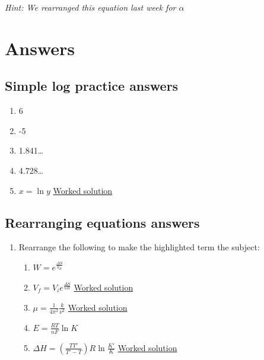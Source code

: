 \documentclass[
]{book}
\providecommand{\tightlist}{%
  \setlength{\itemsep}{0pt}\setlength{\parskip}{0pt}}
\begin{document}
\emph{Hint: We rearranged this equation last week for \(\alpha\)}

\hypertarget{sec:Answers2}{%
\section{Answers}\label{sec:Answers2}}

\hypertarget{subsec:logpracticeans}{%
\subsection{Simple log practice answers}\label{subsec:logpracticeans}}

\begin{enumerate}
\def\labelenumi{\arabic{enumi}.}
\tightlist
\item
  6
\item
  -5
\item
  1.841\ldots{}
\item
  4.728\ldots{}
\item
  \(x = \ln y\) \href{https://www.youtube.com/embed/8ULExqdw4Ko}{Worked solution}
\end{enumerate}

\hypertarget{subsec:logrearrangeans}{%
\subsection{Rearranging equations answers}\label{subsec:logrearrangeans}}

\begin{enumerate}
\def\labelenumi{\arabic{enumi}.}
\tightlist
\item
  Rearrange the following to make the highlighted term the subject:

  \begin{enumerate}
  \def\labelenumii{\alph{enumii}.}
  \tightlist
  \item
    \(W = e^{\frac{\Delta S}{k_B}}\)
  \item
    \(V_f=V_i e^{\frac{\Delta S}{nR}}\) \href{https://www.youtube.com/embed/qRwwTuQ4j8E}{Worked solution}
  \item
    \(\mu=\frac{1}{4 \pi^2}\frac{k}{\nu^2}\) \href{https://www.youtube.com/embed/fBjIQekmxjY}{Worked solution}
  \item
    \(E=\frac{RT}{nF}\ln K\)
  \item
    \(\Delta H = \left(\frac{TT'}{T'-T}\right)R \ln \frac{K'}{K}\) \href{https://www.youtube.com/embed/OEoDryg8rdo}{Worked solution}
  \end{enumerate}
\end{enumerate}
\end{document}
